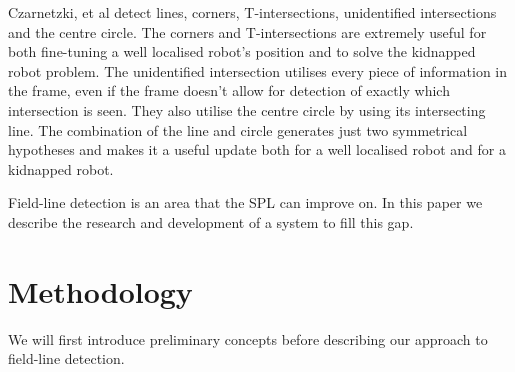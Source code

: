 \documentclass[runningheads,a4paper]{llncs}
\begin{document}
Czarnetzki, et al \cite{NaoDevils2010} detect lines, corners, T-intersections, unidentified intersections and the centre circle. The corners and T-intersections are extremely useful for both fine-tuning a well localised robot's position and to solve the kidnapped robot problem. The unidentified intersection utilises every piece of information in the frame, even if the frame doesn't allow for detection of exactly which intersection is seen. They also utilise the centre circle by using its intersecting line. The combination of the line and circle generates just two symmetrical hypotheses and makes it a useful update both for a well localised robot and for a kidnapped robot.

Field-line detection is an area that the SPL can improve on. In this paper we describe the research and development of a system to fill this gap.

\section{Methodology}

We will first introduce preliminary concepts before describing our approach to field-line detection.


\end{document}
